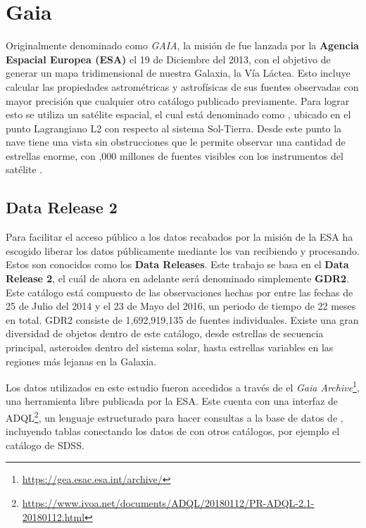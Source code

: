 \section{Gaia} \label{muestra:sec:gaia}

Originalmente denominado como \textit{GAIA}, la misión de \gaia fue lanzada por
la \textbf{Agencia Espacial Europea (ESA)} el 19 de Diciembre del 2013, con el
objetivo de generar un mapa tridimensional de nuestra Galaxia, la Vía Láctea.
Esto incluye calcular las propiedades astrométricas y astrofísicas de sus
fuentes observadas con mayor precisión que cualquier otro catálogo publicado
previamente. Para lograr esto se utiliza un satélite espacial, el cual está
denominado como \gaiaNoSpace, ubicado en el punto Lagrangiano L2 con respecto al
sistema Sol-Tierra. Desde este punto la nave tiene una vista sin obstrucciones
que le permite observar una cantidad de estrellas enorme, con ,000 millones de fuentes visibles con los instrumentos del satélite
\gaiaNoSpace. \citet*{gaiaMission}


\subsection{Data Release 2} \label{muestra:sec:gaia:dr2}

Para facilitar el acceso público a los datos recabados por la misión de \gaia la
ESA ha escogido liberar los datos públicamente mediante los van recibiendo y
procesando. Estos son conocidos como los \textbf{Data Releases}. Este trabajo se
basa en el \textbf{Data Release 2}, el cuál de ahora en adelante será denominado
simplemente \textbf{GDR2}. Este catálogo está compuesto de las observaciones
hechas por \gaia entre las fechas de 25 de Julio del 2014 y el 23 de Mayo del
2016, un periodo de tiempo de 22 meses en total. \citet*{gaiaDr2} GDR2 consiste
de 1,692,919,135 de fuentes individuales. Existe una gran diversidad de objetos
dentro de este catálogo, desde estrellas de secuencia principal, asteroides
dentro del sistema solar, hasta estrellas variables en las regiones más lejanas
en la Galaxia.

Los datos utilizados en este estudio fueron accedidos a través de el
\textit{Gaia Archive}\footnote{\url{https://gea.esac.esa.int/archive/}}, una
herramienta libre publicada por la ESA. Este cuenta con una interfaz de
ADQL\footnote{\url{https://www.ivoa.net/documents/ADQL/20180112/PR-ADQL-2.1-20180112.html}},
un lenguaje estructurado para hacer consultas a la base de datos de
\gaiaNoSpace, incluyendo tablas conectando los datos de \gaia con otros
catálogos, por ejemplo el catálogo de SDSS.